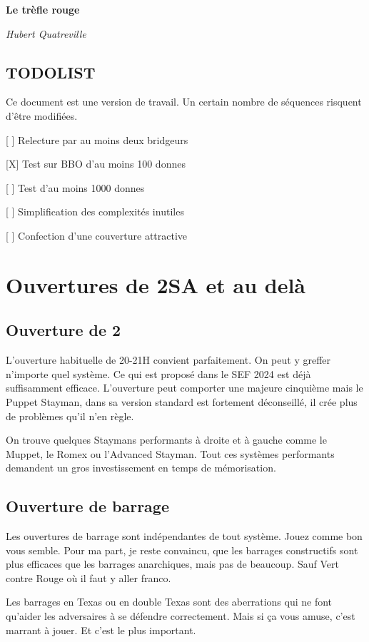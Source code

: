 \documentclass[a4paper,12pt, french]{book}
\begin{document}
 \begin{titlepage}
 \centering
 {\huge\bfseries Le trèfle rouge\par}

 {\Large\itshape Hubert Quatreville\par}
 \vfill
\end{titlepage}


\section*{TODOLIST}

Ce document est une version de travail.
Un certain nombre de séquences risquent d'être modifiées.

[ ] Relecture par au moins deux bridgeurs

[X] Test sur BBO d'au moins 100 donnes

[ ] Test d'au moins 1000 donnes

[ ] Simplification des complexités inutiles

[ ] Confection d'une couverture attractive













\chapter{Ouvertures de 2SA et au delà}

\section*{Ouverture de 2\NT}

L'ouverture habituelle de 20-21H convient parfaitement.
On peut y greffer n'importe quel système. Ce qui est proposé dans le SEF 2024 est déjà suffisamment efficace. L'ouverture peut comporter une majeure cinquième mais le Puppet Stayman, dans sa version standard est fortement déconseillé, il crée plus de problèmes qu'il n'en règle.

On trouve quelques Staymans performants à droite et à gauche comme le Muppet, le Romex ou l'Advanced Stayman. Tout ces systèmes performants demandent un gros investissement en temps de mémorisation.

\section*{Ouverture de barrage}

Les ouvertures de barrage sont indépendantes de tout système. Jouez comme bon vous semble. Pour ma part, je reste convaincu, que les barrages constructifs sont plus efficaces que les barrages anarchiques, mais pas de beaucoup. Sauf Vert contre Rouge où il faut y aller franco.

Les barrages en Texas ou en double Texas sont des aberrations qui ne font qu'aider les adversaires à se défendre correctement.
Mais si ça vous amuse, c'est marrant à jouer. Et c'est le plus important.
\end{document}
